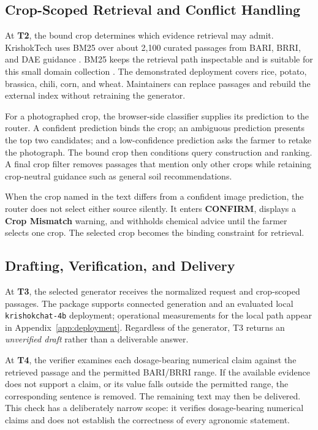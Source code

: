 \documentclass[11pt,a4paper]{article}
\begin{document}
\subsection{Crop-Scoped Retrieval and Conflict Handling}
\label{sec:system_retrieval}

At \textbf{T2}, the bound crop determines which evidence retrieval may admit. KrishokTech uses BM25 over about 2,100 curated passages from BARI, BRRI, and DAE guidance \citep{bari_handbook2023,brri_handbook2024,dae_extension_manual}. BM25 keeps the retrieval path inspectable and is suitable for this small domain collection \citep{huly-etal-2024-old-ir}. The demonstrated deployment covers rice, potato, brassica, chili, corn, and wheat. Maintainers can replace passages and rebuild the external index without retraining the generator.

For a photographed crop, the browser-side classifier supplies its prediction to the router. A confident prediction binds the crop; an ambiguous prediction presents the top two candidates; and a low-confidence prediction asks the farmer to retake the photograph. The bound crop then conditions query construction and ranking. A final crop filter removes passages that mention only other crops while retaining crop-neutral guidance such as general soil recommendations.

When the crop named in the text differs from a confident image prediction, the router does not select either source silently. It enters \textbf{CONFIRM}, displays a \textbf{Crop Mismatch} warning, and withholds chemical advice until the farmer selects one crop. The selected crop becomes the binding constraint for retrieval.

\subsection{Drafting, Verification, and Delivery}
\label{sec:system_verification}

At \textbf{T3}, the selected generator receives the normalized request and crop-scoped passages. The package supports connected generation and an evaluated local \texttt{krishokchat-4b} deployment; operational measurements for the local path appear in Appendix~\ref{app:deployment}. Regardless of the generator, T3 returns an \emph{unverified draft} rather than a deliverable answer.

At \textbf{T4}, the verifier examines each dosage-bearing numerical claim against the retrieved passage and the permitted BARI/BRRI range. If the available evidence does not support a claim, or its value falls outside the permitted range, the corresponding sentence is removed. The remaining text may then be delivered. This check has a deliberately narrow scope: it verifies dosage-bearing numerical claims and does not establish the correctness of every agronomic statement.
\end{document}
